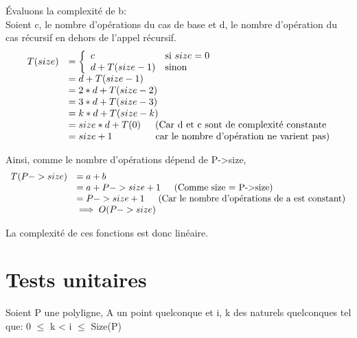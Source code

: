 \documentclass[a4paper, 11pt, oneside]{article}
\begin{document}
Évaluons la complexité de b: \\
Soient c, le nombre d'opérations du cas de base et d, le nombre d'opération du cas récursif en dehors de l'appel récursif.
$$
\begin{array}{ll}
T(size)
&=\left\{
    \begin{array}{ll}
        c & \mbox{si } size = 0 \\
        d + T(size-1) & \mbox{sinon}
    \end{array}
\right.\\
&= d + T(size-1)\\
&= 2*d + T(size-2)\\
&= 3*d + T(size-3)\\
&= k*d + T(size-k)\\
&= size*d + T(0) \text{\indent (Car d et c sont de complexité constante} \\
&= size + 1 \text{\indent\indent\indent car le nombre d'opération ne varient pas)}\\
\end{array}
$$

Ainsi, comme le nombre d'opérations dépend de P->size,
$$
\begin{array}{ll}
T(P->size)
     &= a + b \\
     &= a + P->size + 1 \text{\indent (Comme size = P->size)} \\
     &= P->size + 1 \text{\indent (Car le nombre d'opérations de a est constant)}\\
     &\implies O(P->size)\\
\end{array}
$$

La complexité de ces fonctions est donc linéaire.

\section{Tests unitaires}
Soient P une polyligne, A un point quelconque et i, k des naturels quelconques tel que: 0 $\leq$ k < i $\leq$ Size(P)
\end{document}
